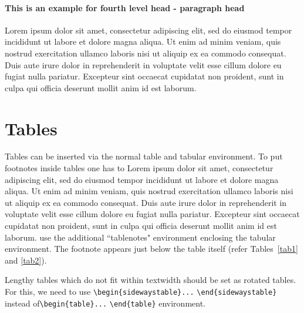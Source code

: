 \documentclass[unnumsec,webpdf,contemporary,large]{oup-authoring-template}%
\theoremstyle{thmstyleone}%
\theoremstyle{thmstyletwo}%
\theoremstyle{thmstylethree}%
\begin{document}
\paragraph{This is an example for fourth level head - paragraph head}

Lorem ipsum dolor sit amet, consectetur adipiscing elit, sed do eiusmod tempor incididunt ut labore et dolore magna aliqua. Ut enim ad minim veniam, quis nostrud exercitation ullamco laboris nisi ut aliquip ex ea commodo consequat. Duis aute irure dolor in reprehenderit in voluptate velit esse cillum dolore eu fugiat nulla pariatur. Excepteur sint occaecat cupidatat non proident, sunt in culpa qui officia deserunt mollit anim id est laborum.



\section{Tables}\label{sec5}

Tables can be inserted via the normal table and tabular environment. To put
footnotes inside tables one has to Lorem ipsum dolor sit amet, consectetur adipiscing elit, sed do eiusmod tempor incididunt ut labore et dolore magna aliqua. Ut enim ad minim veniam, quis nostrud exercitation ullamco laboris nisi ut aliquip ex ea commodo consequat. Duis aute irure dolor in reprehenderit in voluptate velit esse cillum dolore eu fugiat nulla pariatur. Excepteur sint occaecat cupidatat non proident, sunt in culpa qui officia deserunt mollit anim id est laborum. use the additional ``tablenotes" environment
enclosing the tabular environment. The footnote appears just below the table
itself (refer Tables~\ref{tab1} and \ref{tab2}).

Lengthy tables which do not fit within textwidth should be set as rotated tables. For this, we need to use \verb+\begin{sidewaystable}...+ \verb+\end{sidewaystable}+ instead of\break \verb+\begin{table}...+ \verb+\end{table}+ environment.
\end{document}
